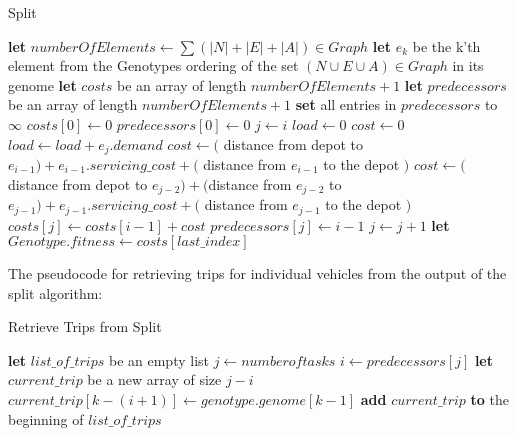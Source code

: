 \begin{algorithm}
\caption{Split}\label{split-pseudocode}
\begin{algorithmic}[1]

	\State \textbf{let} $numberOfElements \leftarrow \sum (|N|+|E|+|A|) \in Graph$
	\State \textbf{let} $e_k$ be the k'th element from the Genotypes ordering of the set $(N \cup E \cup A) \in Graph$ in its genome
	\State \textbf{let} $costs$ be an array of length $numberOfElements + 1$
	\State \textbf{let} $predecessors$ be an array of length $numberOfElements + 1$
	\State \textbf{set} all entries in $predecessors$ to $\infty$
	\State $costs[0] \leftarrow 0$
	\State $predecessors[0] \leftarrow 0$
	\Statex
		\State $j \leftarrow i$
		\State $load \leftarrow 0$
		\State $cost \leftarrow 0$
		\DoWhile
			\State $load \leftarrow load + e_j.demand$
			\Statex
				\State $cost \leftarrow($ distance from depot to $e_{i-1}) + e_{i-1}.servicing\_cost +($ distance from $e_{i-1}$ to the depot $)$
			\Else
				\State $cost \leftarrow($ distance from depot to $e_{j-2}) + ($distance from $e_{j-2}$ to $e_{j-1}) + e_{j-1}.servicing\_cost +($ distance from $e_{j-1}$ to the depot $)$
			\EndIf
			\Statex
				\State $costs[j] \leftarrow costs[i - 1] + cost$
				\State $predecessors[j] \leftarrow i - 1$
			\EndIf
			\Statex
			\State $j \leftarrow j + 1$
	\EndFor
	\Statex
	\State \textbf{let} $Genotype.fitness \leftarrow costs[last\_index]$
\EndProcedure

\end{algorithmic}
\end{algorithm}

The pseudocode for retrieving trips for individual vehicles from the output of the split algorithm:

\begin{algorithm}
\caption{Retrieve Trips from Split}\label{split-retrieve-pseudocode}
\begin{algorithmic}[1]

	\State \textbf{let} $list\_of\_trips$ be an empty list
	\State $j \leftarrow number of tasks$
	\DoWhile
		\State $i \leftarrow predecessors[j]$
		\State \textbf{let} $current\_trip$ be a new array of size $j - i$
			\State $current\_trip[k-(i+1)] \leftarrow genotype.genome[k-1]$
		\EndFor
		\State \textbf{add} $current\_trip$ \textbf{to} the beginning of $list\_of\_trips$
\EndProcedure

\end{algorithmic}
\end{algorithm}

